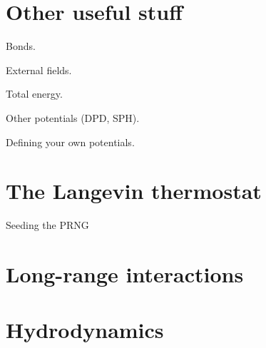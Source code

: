 \documentclass[a4paper,12pt,openany,hidelinks]{book}
\begin{document}
\chapter{Other useful stuff}

Bonds.

External fields.

Total energy.

Other potentials (DPD, SPH).

Defining your own potentials.

\chapter{The Langevin thermostat}

Seeding the PRNG

\chapter{Long-range interactions}

\chapter{Hydrodynamics}
\end{document}
